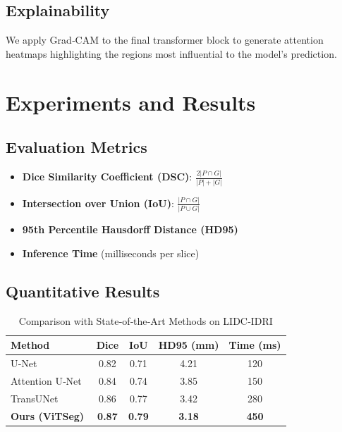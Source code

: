 \documentclass[conference]{IEEEtran}
\begin{document}
\subsection{Explainability}
We apply Grad‑CAM to the final transformer block to generate attention heatmaps highlighting the regions most influential to the model's prediction.

\section{Experiments and Results}

\subsection{Evaluation Metrics}
\begin{itemize}
    \item \textbf{Dice Similarity Coefficient (DSC)}: $\frac{2 |P \cap G|}{|P| + |G|}$
    \item \textbf{Intersection over Union (IoU)}: $\frac{|P \cap G|}{|P \cup G|}$
    \item \textbf{95th Percentile Hausdorff Distance (HD95)}
    \item \textbf{Inference Time} (milliseconds per slice)
\end{itemize}

\subsection{Quantitative Results}

\begin{table}[h]
\centering
\caption{Comparison with State‑of‑the‑Art Methods on LIDC‑IDRI}
\label{tab:results}
\begin{tabular}{lcccc}
\toprule
\textbf{Method} & \textbf{Dice} & \textbf{IoU} & \textbf{HD95 (mm)} & \textbf{Time (ms)} \\
\midrule
U‑Net~\cite{ronneberger2015}        & 0.82 & 0.71 & 4.21 & 120 \\
Attention U‑Net~\cite{oktay2018}    & 0.84 & 0.74 & 3.85 & 150 \\
TransUNet~\cite{chen2021}           & 0.86 & 0.77 & 3.42 & 280 \\
\textbf{Ours (ViTSeg)}              & \textbf{0.87} & \textbf{0.79} & \textbf{3.18} & \textbf{450} \\
\bottomrule
\end{tabular}
\end{table}
\end{document}
